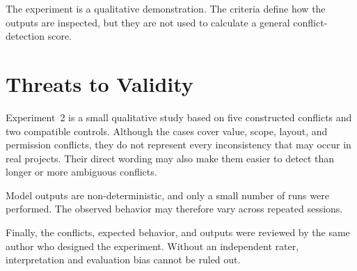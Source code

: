 The experiment is a qualitative demonstration. The criteria define how the
outputs are inspected, but they are not used to calculate a general
conflict-detection score.

\section{Threats to Validity}
\label{sec:conflict-threats}

Experiment~2 is a small qualitative study based on five constructed conflicts
and two compatible controls. Although the cases cover value, scope, layout,
and permission conflicts, they do not represent every inconsistency that may
occur in real projects. Their direct wording may also make them easier to
detect than longer or more ambiguous conflicts.

Model outputs are non-deterministic, and only a small number of runs were
performed. The observed behavior may therefore vary across repeated sessions.

Finally, the conflicts, expected behavior, and outputs were reviewed by the
same author who designed the experiment. Without an independent rater,
interpretation and evaluation bias cannot be ruled out.

